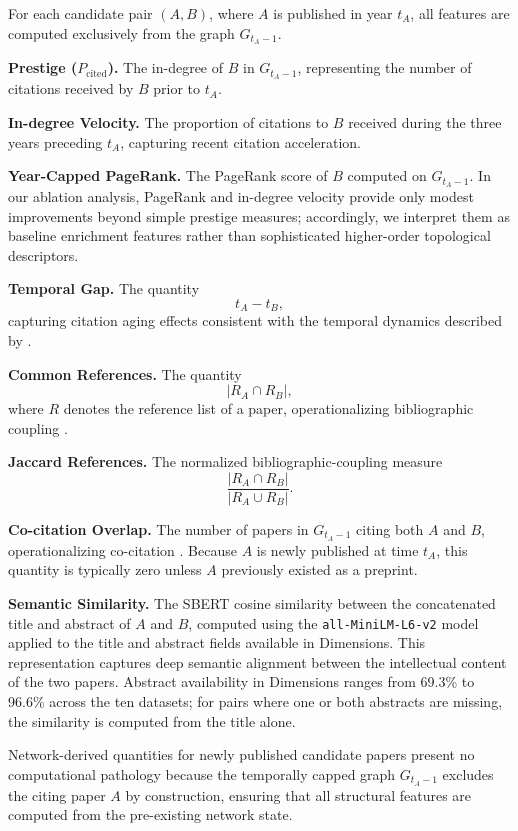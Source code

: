 \documentclass[11pt,a4paper]{article}
\begin{document}
For each candidate pair \((A,B)\), where \(A\) is published in year \(t_A\), all features are computed exclusively from the graph \(G_{t_A-1}\).

\textbf{Prestige (\(P_{\mathrm{cited}}\)).}
The in-degree of \(B\) in \(G_{t_A-1}\), representing the number of citations received by \(B\) prior to \(t_A\).

\textbf{In-degree Velocity.}
The proportion of citations to \(B\) received during the three years preceding \(t_A\), capturing recent citation acceleration.

\textbf{Year-Capped PageRank.}
The PageRank score of \(B\) computed on \(G_{t_A-1}\). In our ablation analysis, PageRank and in-degree velocity provide only modest improvements beyond simple prestige measures; accordingly, we interpret them as baseline enrichment features rather than sophisticated higher-order topological descriptors.

\textbf{Temporal Gap.}
The quantity
\[
t_A - t_B,
\]
capturing citation aging effects consistent with the temporal dynamics described by \citet{wang2013quantifying}.

\textbf{Common References.}
The quantity
\[
|R_A \cap R_B|,
\]
where \(R\) denotes the reference list of a paper, operationalizing bibliographic coupling \citep{kessler1963bibliographic}.

\textbf{Jaccard References.}
The normalized bibliographic-coupling measure
\[
\frac{|R_A \cap R_B|}
{|R_A \cup R_B|}.
\]

\textbf{Co-citation Overlap.}
The number of papers in \(G_{t_A-1}\) citing both \(A\) and \(B\), operationalizing co-citation \citep{small1973co}. Because \(A\) is newly published at time \(t_A\), this quantity is typically zero unless \(A\) previously existed as a preprint.

\textbf{Semantic Similarity.}
The SBERT cosine similarity between the concatenated title and abstract of \(A\) and \(B\), computed using the \texttt{all-MiniLM-L6-v2} model applied to the title and abstract fields available in Dimensions. This representation captures deep semantic alignment between the intellectual content of the two papers. Abstract availability in Dimensions ranges from 69.3\% to 96.6\% across the ten datasets; for pairs where one or both abstracts are missing, the similarity is computed from the title alone.

Network-derived quantities for newly published candidate papers present no computational pathology because the temporally capped graph $G_{t_A-1}$ excludes the citing paper $A$ by construction, ensuring that all structural features are computed from the pre-existing network state.
\end{document}
